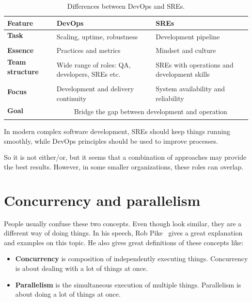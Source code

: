 \begin{table}[H]
	\begin{center}
		\begin{tabular}{l|ll}
			\textbf{Feature} & \textbf{DevOps} & \textbf{SREs}\\
			\hline
			\textbf{Task} & \multirow{2}{10em}{Scaling, uptime, robustness} & \multirow{2}{10em}{Development pipeline} \\
			& & \\
			\textbf{Essence} & Practices and metrics &  Mindset and culture \\
			\textbf{Team structure} & \multirow{3}{10em}{Wide range of roles: QA, developers, SREs etc.} &  \multirow{3}{10em}{SREs with operations and development skills} \\
			&  &  \\
			&  &  \\
			\textbf{Focus} & \multirow{2}{10em}{Development and delivery continuity} & \multirow{2}{10em}{System availability and reliability} \\
			&  &  \\
			\hline
			\textbf{Goal} & \multicolumn{2}{c}{\multirow{2}{12em}{Bridge the gap between development and operation}} \\
			&  &  \\
		\end{tabular}
	\end{center}
	\vspace{-0.5cm}
	\caption{Differences between DevOps and SREs.}
	\label{tab:table10}
\end{table}

\noindent
In modern complex software development, SREs should keep things running smoothly, while DevOps principles should be used to improve processes. 

So it is not either/or, but it seems that a combination of approaches may provide the best results. However, in some smaller organizations, these roles can overlap.
%
%
\section{Concurrency and parallelism}\label{sec:concurency_parallelism}
%
People usually confuse these two concepts. Even though look similar, they are a different way of doing things. In his speech, Rob Pike~\cite{Pike} gives a great explanation and examples on this topic. He also gives great definitions of these concepts like:

\begin{itemize}
	\item \textbf{Concurrency} is composition of independently executing things. Concurrency is about dealing with a lot of things at once.
	\item \textbf{Parallelism} is the simultaneous execution of multiple things. Parallelism is about doing a lot of things at once. 
\end{itemize}

